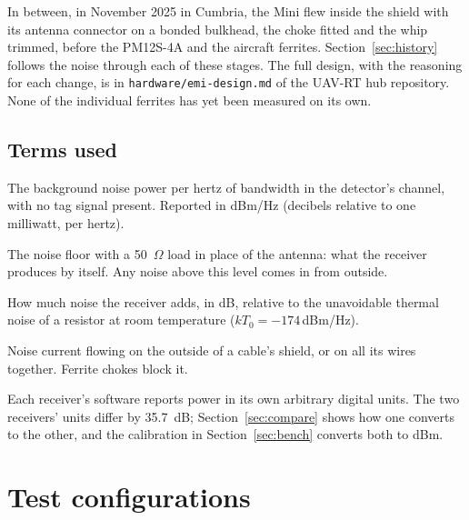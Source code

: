 \documentclass[11pt]{article}
\newcommand{\dBmHz}{\,dBm/Hz}
\begin{document}
In between, in November 2025 in Cumbria, the Mini flew inside the shield with its antenna connector
on a bonded bulkhead, the choke fitted and the whip trimmed, before the PM12S-4A and the aircraft
ferrites.
Section~\ref{sec:history} follows the noise through each of these stages.
The full design, with the reasoning for each change, is in \texttt{hardware/emi-design.md} of the
UAV-RT hub repository. None of the individual ferrites has yet been measured on its own.

\subsection{Terms used}
\begin{description}[leftmargin=1.2em,style=nextline]
\item[Noise floor] The background noise power per hertz of bandwidth in the detector's channel,
with no tag signal present. Reported in dBm/Hz (decibels relative to one milliwatt, per hertz).
\item[Receiver's own noise] The noise floor with a 50~$\Omega$ load in place of the antenna: what
the receiver produces by itself. Any noise above this level comes in from outside.
\item[Noise figure (NF)] How much noise the receiver adds, in dB, relative to the unavoidable
thermal noise of a resistor at room temperature ($kT_0 = -174$\dBmHz).
\item[Common-mode current] Noise current flowing on the outside of a cable's shield, or on all
its wires together. Ferrite chokes block it.
\item[Receiver units] Each receiver's software reports power in its own arbitrary digital units.
The two receivers' units differ by 35.7~dB; Section~\ref{sec:compare} shows how one converts to
the other, and the calibration in Section~\ref{sec:bench} converts both to dBm.
\end{description}

\section{Test configurations}
\end{document}
